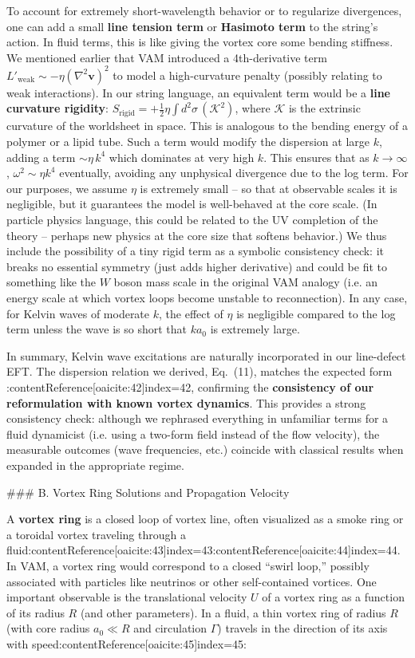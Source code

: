 \documentclass[12pt]{article}
\begin{document}
To account for extremely short-wavelength behavior or to regularize divergences, one can add a small \textbf{line tension term} or \textbf{Hasimoto term} to the string’s action. In fluid terms, this is like giving the vortex core some bending stiffness. We mentioned earlier that VAM introduced a 4th-derivative term $L'_{\text{weak}} \sim -\eta (\nabla^2 \mathbf{v})^2$ to model a high-curvature penalty (possibly relating to weak interactions). In our string language, an equivalent term would be a \textbf{line curvature rigidity}: $S_{\text{rigid}} = + \frac{1}{2}\eta \int d^2\sigma\, (\mathcal{K}^2)$, where $\mathcal{K}$ is the extrinsic curvature of the worldsheet in space. This is analogous to the bending energy of a polymer or a lipid tube. Such a term would modify the dispersion at large $k$, adding a term $\sim \eta\, k^4$ which dominates at very high $k$. This ensures that as $k \to \infty$, $\omega^2 \sim \eta k^4$ eventually, avoiding any unphysical divergence due to the log term. For our purposes, we assume $\eta$ is extremely small – so that at observable scales it is negligible, but it guarantees the model is well-behaved at the core scale. (In particle physics language, this could be related to the UV completion of the theory – perhaps new physics at the core size that softens behavior.) We thus include the possibility of a tiny rigid term as a symbolic consistency check: it breaks no essential symmetry (just adds higher derivative) and could be fit to something like the $W$ boson mass scale in the original VAM analogy (i.e. an energy scale at which vortex loops become unstable to reconnection). In any case, for Kelvin waves of moderate $k$, the effect of $\eta$ is negligible compared to the log term unless the wave is so short that $k a_0$ is extremely large.

In summary, Kelvin wave excitations are naturally incorporated in our line-defect EFT. The dispersion relation we derived, Eq. (11), matches the expected form :contentReference[oaicite:42]{index=42}, confirming the \textbf{consistency of our reformulation with known vortex dynamics}. This provides a strong consistency check: although we rephrased everything in unfamiliar terms for a fluid dynamicist (i.e. using a two-form field instead of the flow velocity), the measurable outcomes (wave frequencies, etc.) coincide with classical results when expanded in the appropriate regime.

### B. Vortex Ring Solutions and Propagation Velocity

A \textbf{vortex ring} is a closed loop of vortex line, often visualized as a smoke ring or a toroidal vortex traveling through a fluid:contentReference[oaicite:43]{index=43}:contentReference[oaicite:44]{index=44}. In VAM, a vortex ring would correspond to a closed “swirl loop,” possibly associated with particles like neutrinos or other self-contained vortices. One important observable is the translational velocity $U$ of a vortex ring as a function of its radius $R$ (and other parameters). In a fluid, a thin vortex ring of radius $R$ (with core radius $a_0 \ll R$ and circulation $\Gamma$) travels in the direction of its axis with speed:contentReference[oaicite:45]{index=45}:
\end{document}
